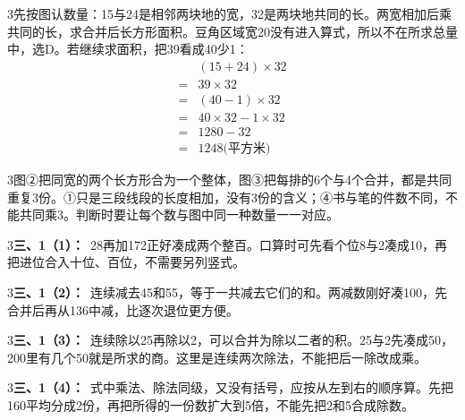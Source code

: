 \documentclass[multi=snippet,border={5bp 20bp 5bp 5bp}]{standalone}
\newenvironment{snippet}[3]{\begin{minipage}{#1bp}\color{answerred}\fontsize{#2}{#3}\selectfont\raggedright}{\end{minipage}}
\begin{document}
\begin{snippet}{505}{11.5}{14}\begin{multicols}{3}\raggedcolumns 先按图认数量：15与24是相邻两块地的宽，32是两块地共同的长。两宽相加后乘共同的长，求合并后长方形面积。豆角区域宽20没有进入算式，所以不在所求总量中，选D。若继续求面积，把39看成40少1：\[\begin{aligned}&(15+24)\times32\\={}&39\times32\\={}&(40-1)\times32\\={}&40\times32-1\times32\\={}&1280-32\\={}&1248\text{(平方米)}\end{aligned}\]\end{multicols}\end{snippet}
\begin{snippet}{505}{11.5}{14}\begin{multicols}{3}\raggedcolumns 图②把同宽的两个长方形合为一个整体，图③把每排的6个与4个合并，都是共同重复3份。①只是三段线段的长度相加，没有3份的含义；④书与笔的件数不同，不能共同乘3。判断时要让每个数与图中同一种数量一一对应。\end{multicols}\end{snippet}
\begin{snippet}{505}{11.5}{14}\begin{multicols}{3}\raggedcolumns \textbf{三、1（1）：}\ 28再加172正好凑成两个整百。口算时可先看个位8与2凑成10，再把进位合入十位、百位，不需要另列竖式。\end{multicols}\end{snippet}
\begin{snippet}{505}{11.5}{14}\begin{multicols}{3}\raggedcolumns \textbf{三、1（2）：}\ 连续减去45和55，等于一共减去它们的和。两减数刚好凑100，先合并后再从136中减，比逐次退位更方便。\end{multicols}\end{snippet}
\begin{snippet}{505}{11.5}{14}\begin{multicols}{3}\raggedcolumns \textbf{三、1（3）：}\ 连续除以25再除以2，可以合并为除以二者的积。25与2先凑成50，200里有几个50就是所求的商。这里是连续两次除法，不能把后一除改成乘。\end{multicols}\end{snippet}
\begin{snippet}{505}{11.5}{14}\begin{multicols}{3}\raggedcolumns \textbf{三、1（4）：}\ 式中乘法、除法同级，又没有括号，应按从左到右的顺序算。先把160平均分成2份，再把所得的一份数扩大到5倍，不能先把2和5合成除数。\end{multicols}\end{snippet}
\end{document}
